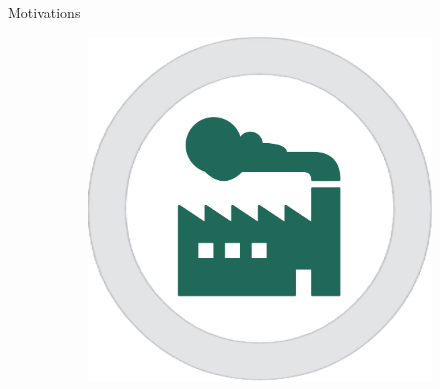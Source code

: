 \documentclass[16pt,usenames,dvipsnames, notheorems]{beamer}
\theoremstyle{definition}
\theoremstyle{example}
\theoremstyle{plain}
\begin{document}
\begin{frame}{Motivations}
\begin{figure}
\begin{subfigure}[c]{0.25\linewidth}
\begin{overprint}
			 \includegraphics[width=\linewidth]{figures/picture_manufactoring.jpg}
		\end{overprint}
	\end{subfigure}
\end{figure}
\end{frame}


\end{document}

